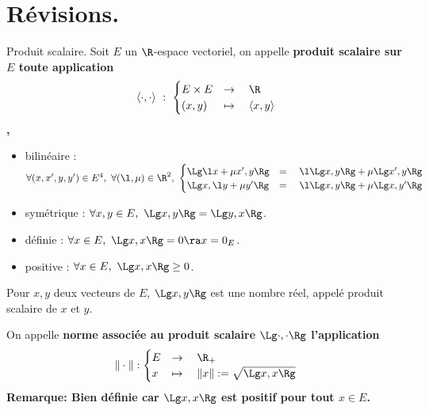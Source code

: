 \documentclass[11pt]{article}
\begin{document}


\renewcommand*{\D}{\cursive{D}}

\vspace*{-0.8cm}

\section{Révisions.}

\begin{defi}{Produit scalaire.}{}
    Soit $E$ un $\R$-espace vectoriel, on appelle \bf{produit scalaire} sur $E$ toute application
    \begin{equation*}
        \langle \cdot,\cdot \rangle ~ : ~ \begin{cases} E\times E &\to \quad \R \\ (x,y) &\mapsto \quad \langle x, y \rangle\end{cases}
    \end{equation*},
    \begin{itemize}
        \item bilinéaire : $\forall(x,x',y,y')\in E^4, ~ \forall(\l,\mu)\in\R^2, ~ \begin{cases}\Lg\l x + \mu x', y\Rg &= \quad \l\Lg x,y \Rg + \mu\Lg x', y \Rg\\\Lg x, \l y + \mu y' \Rg &= \quad \l\Lg x, y \Rg + \mu \Lg x, y' \Rg\end{cases}$
        \item symétrique : $\forall x,y\in E, ~ \Lg x, y \Rg = \Lg y, x \Rg$.
        \item définie : $\forall x \in E, ~ \Lg x, x \Rg = 0 \ra x = 0_E$.
        \item positive : $\forall x \in E, ~ \Lg x, x \Rg \geq 0$.
    \end{itemize}
    Pour $x,y$ deux vecteurs de $E$, $\Lg x, y\Rg$ est une nombre réel, appelé produit scalaire de $x$ et $y$.
\end{defi}

\vspace*{-0.8cm}

\begin{defi}{}{}
    On appelle \bf{norme associée au produit scalaire} $\Lg\cdot,\cdot\Rg$ l'application
    \begin{equation*}
        \|\cdot\|:\begin{cases}E&\to\quad\R_+\\x&\mapsto\quad\|x\|:=\sqrt{\Lg x,x\Rg}\end{cases}
    \end{equation*}
    \bf{Remarque:} Bien définie car $\Lg x,x \Rg$ est positif pour tout $x\in E$.
\end{defi}
\end{document}
